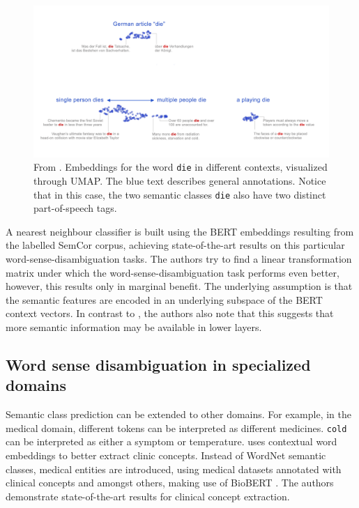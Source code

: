 \documentclass[a4paper,12pt,oneside,openright]{report}
\begin{document}
\begin{figure}
	\center
  \includegraphics[width=0.9\linewidth]{./assets/relatedwork/BERT_plurality.png}
  \caption{From \cite{coenen19}. Embeddings for the word \texttt{die} in different contexts, visualized through UMAP. The blue text describes general annotations.
  Notice that in this case, the two semantic classes \texttt{die} also have two distinct part-of-speech tags.
  }
  \label{fig:BERT_plurality}
\end{figure}

A nearest neighbour classifier is built using the BERT embeddings resulting from the labelled SemCor corpus, achieving state-of-the-art results on this particular word-sense-disambiguation tasks.
The authors try to find a linear transformation matrix under which the word-sense-disambiguation task performs even better, however, this results only in marginal benefit.
The underlying assumption is that the semantic features are encoded in an underlying subspace of the BERT context vectors.
In contrast to \cite{jawahar19}, \cite{coenen19} the authors also note that this suggests that more semantic information may be available in lower layers. \\

\subsection{Word sense disambiguation in specialized domains}

Semantic class prediction can be extended to other domains. 
For example, in the medical domain, different tokens can be interpreted as different medicines. 
\texttt{cold} can be interpreted as either a symptom or temperature.
\cite{si19} uses contextual word embeddings to better extract clinic concepts. 
Instead of WordNet semantic classes, medical entities are introduced, using medical datasets annotated with clinical concepts and amongst others, making use of BioBERT \cite{lee19}.
The authors demonstrate state-of-the-art results for clinical concept extraction. \\
\end{document}
